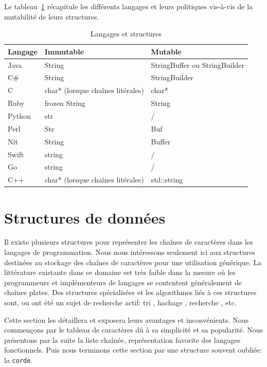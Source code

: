 Le tableau~\ref{mutable_langs} récapitule les différents langages et leurs politiques vis-à-vis de
la mutabilité de leurs structures.

\begin{table}
	\caption{\label{mutable_langs}Langages et structures}
	\centering
	\begin{tabular}{lll}
		\hline
		Langage & Immutable & Mutable \\
		\hline
		Java & String & StringBuffer ou StringBuilder \\
		C\# & String & StringBuilder \\
		C & char* (lorsque chaînes litérales) & char* \\
		Ruby & frozen String & String \\
		Python & str & / \\
		Perl & Str & Buf \\
		Nit & String & Buffer\\
		Swift & string & / \\
		Go & string & / \\
		C++ & char* (lorsque chaînes litérales) & std::string \\
		\hline
	\end{tabular}
\end{table}

\section{Structures de données}\label{state_structs}

Il existe plusieurs structures pour représenter les chaînes de caractères dans les langages
de programmation.
Nous nous intéressons seulement ici aux structures destinées au stockage des chaînes
de caractères pour une utilisation générique.
La littérature existante dans ce domaine est très faible dans la mesure où les
programmeurs et implémenteurs de langages se contentent généralement de chaînes plates.
Des structures spécialisées et les algorithmes liés à ces structures sont, ou ont été
un sujet de recherche actif: tri \cite{bentley1997, hat_trie},
hachage \cite{pearson1990fast, mckenzie1990selecting},
recherche \cite{suffix_arrays, boyer1977fast}, etc.

Cette section les détaillera et exposera leurs avantages et inconvénients.
Nous commençons par le tableau de caractères dû à sa simplicité et sa popularité.
Nous présentons par la suite la liste chaînée, représentation favorite des langages
fonctionnels.
Puis nous terminons cette section par une structure souvent oubliée: la \texttt{corde}.

